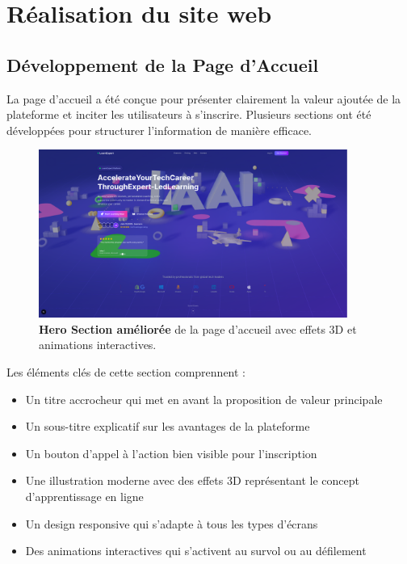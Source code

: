 \section{Réalisation du site web}

\subsection{Développement de la Page d'Accueil}
La page d'accueil a été conçue pour présenter clairement la valeur ajoutée de la plateforme et inciter les utilisateurs à s'inscrire. Plusieurs sections ont été développées pour structurer l'information de manière efficace.

\begin{figure}[h!]
  \centering
  \includegraphics[width=0.9\textwidth,keepaspectratio]{week_2_img/last_and_improved_hero_section_withe_3d_effects_etc.png}
  \caption{\textbf{Hero Section améliorée} de la page d'accueil avec effets 3D et animations interactives.}
  \label{fig:hero_section_improved}
\end{figure}

Les éléments clés de cette section comprennent :
\begin{itemize}
  \item Un titre accrocheur qui met en avant la proposition de valeur principale
  \item Un sous-titre explicatif sur les avantages de la plateforme
  \item Un bouton d'appel à l'action bien visible pour l'inscription
  \item Une illustration moderne avec des effets 3D représentant le concept d'apprentissage en ligne
  \item Un design responsive qui s'adapte à tous les types d'écrans
  \item Des animations interactives qui s'activent au survol ou au défilement
\end{itemize}

